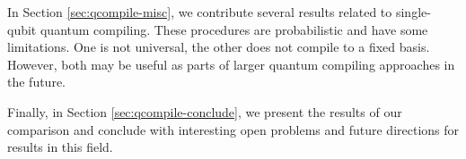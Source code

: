 In Section \ref{sec:qcompile-misc}, we contribute several
results related to single-qubit quantum compiling. These
procedures are probabilistic and have some limitations.
One is not universal, the other does not compile to a
fixed basis. However, both may be useful as parts of
larger quantum compiling approaches in the future.

Finally, in Section \ref{sec:qcompile-conclude}, we present the results of
our comparison and conclude with interesting open problems and
future directions for results in this field.





%

%




%